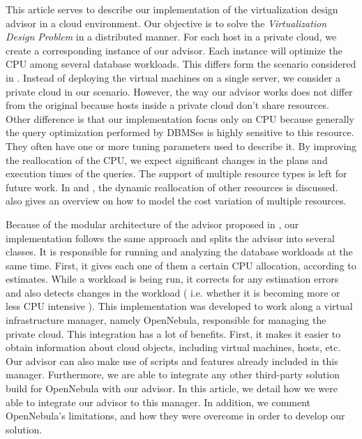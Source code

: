 \documentclass[jidm,a4paper]{jidm} %
\begin{document}
This article serves to describe our implementation of the virtualization design advisor in a cloud environment. Our objective is to solve the \textit{Virtualization Design Problem} in a distributed manner. For each host in a private cloud, we create a corresponding instance of our advisor. Each instance will optimize the CPU among several database workloads. This differs form the scenario considered in \cite{Soror:2008:AVM:1376616.1376711}. Instead of deploying the virtual machines on a single server, we consider a private cloud in our scenario. However, the way our advisor works does not differ from the original because hosts inside a private cloud don't share resources. Other difference is that our implementation focus only on CPU because  generally the query optimization performed by DBMSes is highly sensitive to this resource. They often have one or more tuning parameters used to describe it. By improving the reallocation of the CPU, we expect significant changes in the plans and execution times of the queries. The support of multiple resource types is left for future work. In \cite{Storm:2006:ASM:1182635.1164220} and \cite{springerlink:10.1007/3-540-44469-6_9}, the dynamic reallocation of other resources is discussed. \cite{Soror:2008:AVM:1376616.1376711} also gives an overview on how to model the cost variation of multiple resources.



Because of the modular architecture of the advisor proposed in \cite{Soror:2008:AVM:1376616.1376711}, our implementation follows the same approach and splits the advisor into several classes. It is responsible for running and analyzing the database workloads  at the same time. First, it gives each one of them a certain CPU allocation, according to estimates. While a workload is being run, it corrects for any estimation errors and also detects changes in the workload ( i.e. whether it is becoming more or less CPU intensive ). This implementation was developed to work along a virtual infrastructure manager, namely OpenNebula, responsible for managing the private cloud. This integration has a lot of benefits. First, it makes it easier to obtain information about cloud objects, including virtual machines, hosts, etc. Our advisor can also make use of scripts and features already included in this manager. Furthermore, we are able to integrate any other third-party solution build for OpenNebula with our advisor. In this article, we detail how we were able to integrate our advisor to this manager. In addition, we comment OpenNebula's limitations, and how they were overcome in order to develop our solution.
\end{document}
